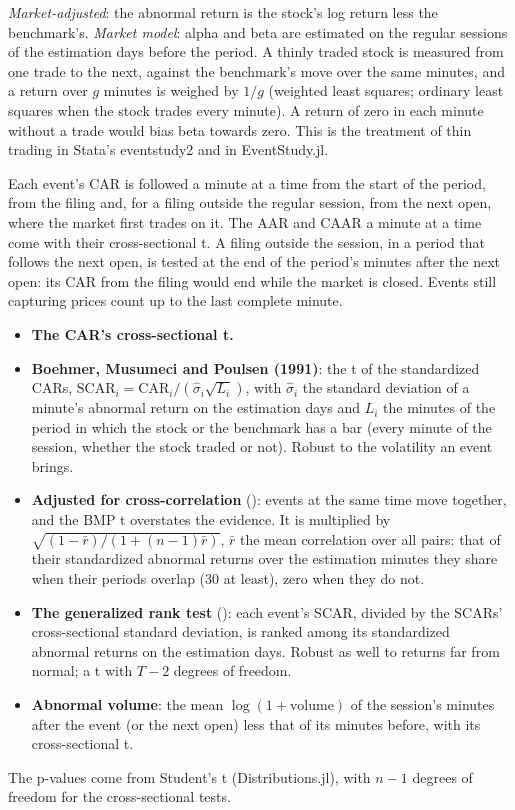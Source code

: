 \emph{Market-adjusted}: the abnormal return is the stock's log return less the benchmark's. \emph{Market model}: alpha
and beta are estimated on the regular sessions of the estimation days before the period. A thinly traded stock is
measured from one trade to the next, against the benchmark's move over the same minutes, and a return over $g$ minutes
is weighed by $1/g$ (weighted least squares; ordinary least squares when the stock trades every minute). A return of
zero in each minute without a trade would bias beta towards zero. This is the treatment of thin trading in Stata's
eventstudy2 and in EventStudy.jl.

Each event's CAR is followed a minute at a time from the start of the period, from the filing and, for a filing outside
the regular session, from the next open, where the market first trades on it. The AAR and CAAR a minute at a time come
with their cross-sectional t. A filing outside the session, in a period that follows the next open, is tested at the end
of the period's minutes after the next open: its CAR from the filing would end while the market is closed. Events
still capturing prices count up to the last complete minute.

\begin{itemize}
  \item \textbf{The CAR's cross-sectional t.}
  \item \textbf{Boehmer, Musumeci and Poulsen (1991)}: the t of the standardized CARs,
    $\mathrm{SCAR}_i = \mathrm{CAR}_i / (\hat\sigma_i \sqrt{L_i})$, with $\hat\sigma_i$ the standard deviation of a
    minute's abnormal return on the estimation days and $L_i$ the minutes of the period in which the stock or the
    benchmark has a bar (every minute of the session, whether the stock traded or not). Robust to the volatility an
    event brings.
  \item \textbf{Adjusted for cross-correlation} (): events at the same time
    move together, and the BMP t overstates the evidence. It is multiplied by $\sqrt{(1-\bar r)/(1+(n-1)\bar r)}$,
    $\bar r$ the mean correlation over all pairs: that of their standardized abnormal returns over the estimation
    minutes they share when their periods overlap (30 at least), zero when they do not.
  \item \textbf{The generalized rank test} (): each event's SCAR, divided by
    the SCARs' cross-sectional standard deviation, is ranked among its standardized abnormal returns on the estimation
    days. Robust as well to returns far from normal; a t with $T-2$ degrees of freedom.
  \item \textbf{Abnormal volume}: the mean $\log(1+\text{volume})$ of the session's minutes after the event (or the next
    open) less that of its minutes before, with its cross-sectional t.
\end{itemize}
The p-values come from Student's t (Distributions.jl), with $n-1$ degrees of freedom for the cross-sectional tests.

